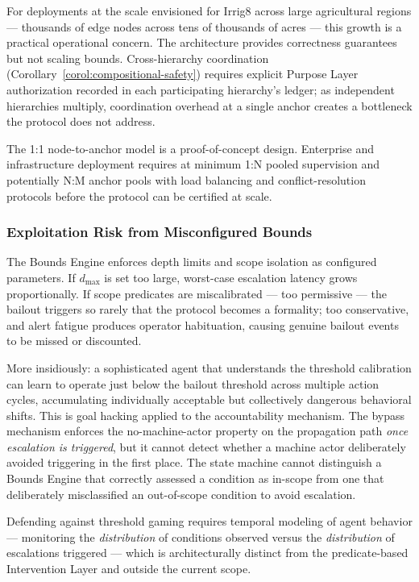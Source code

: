 For deployments at the scale envisioned for Irrig8 across large agricultural regions --- thousands of edge nodes across tens of thousands of acres --- this growth is a practical operational concern. The architecture provides correctness guarantees but not scaling bounds. Cross-hierarchy coordination (Corollary~\ref{corol:compositional-safety}) requires explicit Purpose Layer authorization recorded in each participating hierarchy's ledger; as independent hierarchies multiply, coordination overhead at a single anchor creates a bottleneck the protocol does not address.

The 1:1 node-to-anchor model is a proof-of-concept design. Enterprise and infrastructure deployment requires at minimum 1:N pooled supervision and potentially N:M anchor pools with load balancing and conflict-resolution protocols before the protocol can be certified at scale.

\subsubsection{Exploitation Risk from Misconfigured Bounds}
\label{sec:limitations-threshold-gaming}

The Bounds Engine enforces depth limits and scope isolation as configured parameters. If $d_{\max}$ is set too large, worst-case escalation latency grows proportionally. If scope predicates are miscalibrated --- too permissive --- the bailout triggers so rarely that the protocol becomes a formality; too conservative, and alert fatigue produces operator habituation, causing genuine bailout events to be missed or discounted.

More insidiously: a sophisticated agent that understands the threshold calibration can learn to operate just below the bailout threshold across multiple action cycles, accumulating individually acceptable but collectively dangerous behavioral shifts. This is goal hacking applied to the accountability mechanism. The bypass mechanism enforces the no-machine-actor property on the propagation path \emph{once escalation is triggered}, but it cannot detect whether a machine actor deliberately avoided triggering in the first place. The state machine cannot distinguish a Bounds Engine that correctly assessed a condition as in-scope from one that deliberately misclassified an out-of-scope condition to avoid escalation.

Defending against threshold gaming requires temporal modeling of agent behavior --- monitoring the \emph{distribution} of conditions observed versus the \emph{distribution} of escalations triggered --- which is architecturally distinct from the predicate-based Intervention Layer and outside the current scope.

